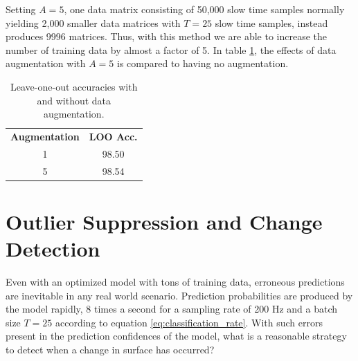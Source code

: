 Setting $A=5$, one data matrix consisting of 50,000 slow time samples normally yielding 2,000 smaller data matrices with $T=25$ slow time samples, instead produces 9996 matrices. Thus, with this method we are able to increase the number of training data by almost a factor of 5. In table \ref{tab:aug}, the effects of data augmentation with $A=5$ is compared to having no augmentation.


\begin{table}
	\label{tab:aug}
	\begin{center}
		\begin{tabular}{|c|c|}
			\hline
			\rowcolor{gray!150}
			\color{white}\textbf{Augmentation} & \color{white}\textbf{LOO Acc.} \\
			1 & 98.50 \\
			5 & 98.54 \\
			\hline
		\end{tabular}
	\end{center}
	\caption{Leave-one-out accuracies with and without data augmentation.}
\end{table}



\section{Outlier Suppression and Change Detection}

\label{surface_change}
Even with an optimized model with tons of training data, erroneous predictions are inevitable in any real world scenario. Prediction probabilities are produced by the model rapidly, 8 times a second for a sampling rate of 200 Hz and a batch size $T=25$ according to equation \eqref{eq:classification_rate}. With such errors present in the prediction confidences of the model, what is a reasonable strategy to detect when a change in surface has occurred?  

